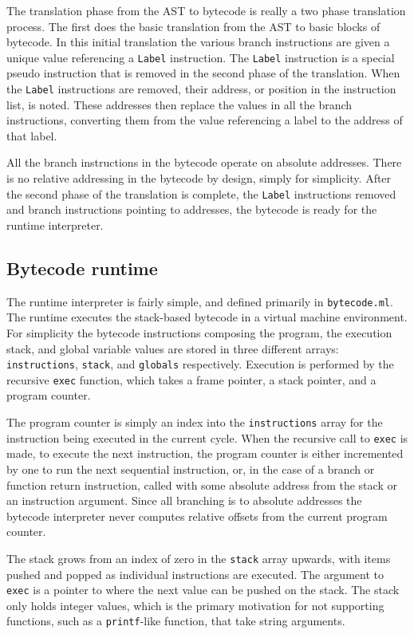 The translation phase from the AST to bytecode is really a two phase translation process.  The first does the basic translation from the AST to basic blocks of bytecode.  In this initial translation the various branch instructions are given a unique value referencing a \texttt{Label} instruction.  The \texttt{Label} instruction is a special pseudo instruction that is removed in the second phase of the translation.  When the \texttt{Label} instructions are removed, their address, or position in the instruction list, is noted.  These addresses then replace the values in all the branch instructions, converting them from the value referencing a label to the address of that label.

All the branch instructions in the bytecode operate on absolute addresses.  There is no relative addressing in the bytecode by design, simply for simplicity.  After the second phase of the translation is complete, the \texttt{Label} instructions removed and branch instructions pointing to addresses, the bytecode is ready for the runtime interpreter.

\subsection{Bytecode runtime}
The runtime interpreter is fairly simple, and defined primarily in \texttt{bytecode.ml}.  The runtime executes the stack-based bytecode in a virtual machine environment.  For simplicity the bytecode instructions composing the program, the execution stack, and global variable values are stored in three different arrays: \texttt{instructions}, \texttt{stack}, and \texttt{globals} respectively.  Execution is performed by the recursive \texttt{exec} function, which takes a frame pointer, a stack pointer, and a program counter.

The program counter is simply an index into the \texttt{instructions} array for the instruction being executed in the current cycle.  When the recursive call to \texttt{exec} is made, to execute the next instruction, the program counter is either incremented by one to run the next sequential instruction, or, in the case of a branch or function return instruction, called with some absolute address from the stack or an instruction argument.  Since all branching is to absolute addresses the bytecode interpreter never computes relative offsets from the current program counter.

The stack grows from an index of zero in the \texttt{stack} array upwards, with items pushed and popped as individual instructions are executed.  The argument to \texttt{exec} is a pointer to where the next value can be pushed on the stack.  The stack only holds integer values, which is the primary motivation for not supporting functions, such as a \texttt{printf}-like function, that take string arguments.

